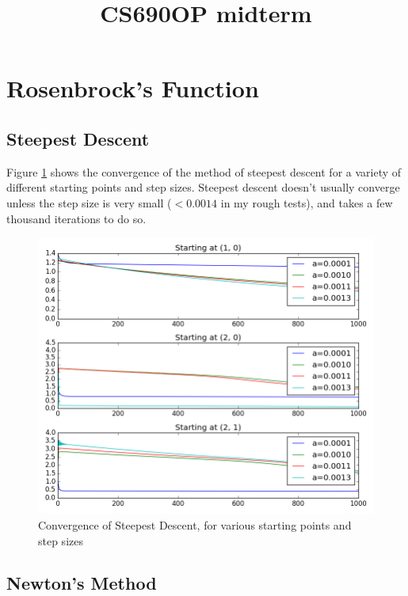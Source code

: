 \documentclass{article}
\begin{document}
\title{CS690OP midterm}
\maketitle

\section{Rosenbrock's Function}

\subsection{Steepest Descent}

Figure \ref{fig:rosenbrock-linear} shows the convergence of the method of steepest descent for a variety of different starting points and step sizes. Steepest descent doesn't usually converge unless the step size is very small ($< 0.0014$ in my rough tests), and takes a few thousand iterations to do so.

\begin{figure}[!ht]
  \centering
  \includegraphics[width=\textwidth,keepaspectratio=true]{rosenbrock-linear.png}
  \caption{Convergence of Steepest Descent, for various starting points and step sizes}
  \label{fig:rosenbrock-linear}
\end{figure}

\subsection{Newton's Method}
\end{document}
